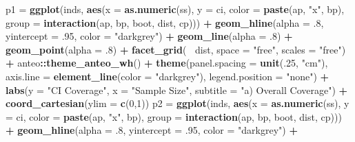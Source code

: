 \documentclass[]{DissertateUSU}
\newenvironment{Shaded}{\begin{snugshade}}{\end{snugshade}}
\newcommand{\KeywordTok}[1]{\textcolor[rgb]{0.13,0.29,0.53}{\textbf{#1}}}
\newcommand{\DataTypeTok}[1]{\textcolor[rgb]{0.13,0.29,0.53}{#1}}
\newcommand{\DecValTok}[1]{\textcolor[rgb]{0.00,0.00,0.81}{#1}}
\newcommand{\StringTok}[1]{\textcolor[rgb]{0.31,0.60,0.02}{#1}}
\newcommand{\OperatorTok}[1]{\textcolor[rgb]{0.81,0.36,0.00}{\textbf{#1}}}
\newcommand{\NormalTok}[1]{#1}
\begin{document}
\begin{Shaded}
\begin{Highlighting}[]
{{{{{{{\NormalTok{p1 =}\StringTok{ }\KeywordTok{ggplot}\NormalTok{(inds, }\KeywordTok{aes}\NormalTok{(}\DataTypeTok{x =} \KeywordTok{as.numeric}\NormalTok{(ss), }\DataTypeTok{y =}\NormalTok{ ci, }
                      \DataTypeTok{color =} \KeywordTok{paste}\NormalTok{(ap, }\StringTok{"x"}\NormalTok{, bp), }
                      \DataTypeTok{group =} \KeywordTok{interaction}\NormalTok{(ap, bp, boot, dist, cp))) }\OperatorTok{+}
\StringTok{  }\KeywordTok{geom_hline}\NormalTok{(}\DataTypeTok{alpha =}\NormalTok{ .}\DecValTok{8}\NormalTok{, }\DataTypeTok{yintercept =}\NormalTok{ .}\DecValTok{95}\NormalTok{, }\DataTypeTok{color =} \StringTok{"darkgrey"}\NormalTok{) }\OperatorTok{+}
\StringTok{  }\KeywordTok{geom_line}\NormalTok{(}\DataTypeTok{alpha =}\NormalTok{ .}\DecValTok{8}\NormalTok{) }\OperatorTok{+}
\StringTok{  }\KeywordTok{geom_point}\NormalTok{(}\DataTypeTok{alpha =}\NormalTok{ .}\DecValTok{8}\NormalTok{) }\OperatorTok{+}
\StringTok{  }\KeywordTok{facet_grid}\NormalTok{(}\OperatorTok{~}\StringTok{ }\NormalTok{dist, }\DataTypeTok{space =} \StringTok{"free"}\NormalTok{, }\DataTypeTok{scales =} \StringTok{"free"}\NormalTok{) }\OperatorTok{+}
\StringTok{  }\NormalTok{anteo}\OperatorTok{::}\KeywordTok{theme_anteo_wh}\NormalTok{() }\OperatorTok{+}
\StringTok{  }\KeywordTok{theme}\NormalTok{(}\DataTypeTok{panel.spacing =} \KeywordTok{unit}\NormalTok{(.}\DecValTok{25}\NormalTok{, }\StringTok{"cm"}\NormalTok{),}
        \DataTypeTok{axis.line =} \KeywordTok{element_line}\NormalTok{(}\DataTypeTok{color =} \StringTok{"darkgrey"}\NormalTok{),}
        \DataTypeTok{legend.position =} \StringTok{"none"}\NormalTok{) }\OperatorTok{+}
\StringTok{  }\KeywordTok{labs}\NormalTok{(}\DataTypeTok{y =} \StringTok{"CI Coverage"}\NormalTok{,}
       \DataTypeTok{x =} \StringTok{"Sample Size"}\NormalTok{,}
       \DataTypeTok{subtitle =} \StringTok{"a) Overall Coverage"}\NormalTok{) }\OperatorTok{+}
\StringTok{  }\KeywordTok{coord_cartesian}\NormalTok{(}\DataTypeTok{ylim =} \KeywordTok{c}\NormalTok{(}\DecValTok{0}\NormalTok{,}\DecValTok{1}\NormalTok{))}
\NormalTok{p2 =}\StringTok{ }\KeywordTok{ggplot}\NormalTok{(inds, }\KeywordTok{aes}\NormalTok{(}\DataTypeTok{x =} \KeywordTok{as.numeric}\NormalTok{(ss), }\DataTypeTok{y =}\NormalTok{ ci, }
                      \DataTypeTok{color =} \KeywordTok{paste}\NormalTok{(ap, }\StringTok{"x"}\NormalTok{, bp), }
                      \DataTypeTok{group =} \KeywordTok{interaction}\NormalTok{(ap, bp, boot, dist, cp))) }\OperatorTok{+}
\StringTok{  }\KeywordTok{geom_hline}\NormalTok{(}\DataTypeTok{alpha =}\NormalTok{ .}\DecValTok{8}\NormalTok{, }\DataTypeTok{yintercept =}\NormalTok{ .}\DecValTok{95}\NormalTok{, }\DataTypeTok{color =} \StringTok{"darkgrey"}\NormalTok{) }\OperatorTok{+}
}}}}}}}
\end{Highlighting}
\end{Shaded}
\end{document}
